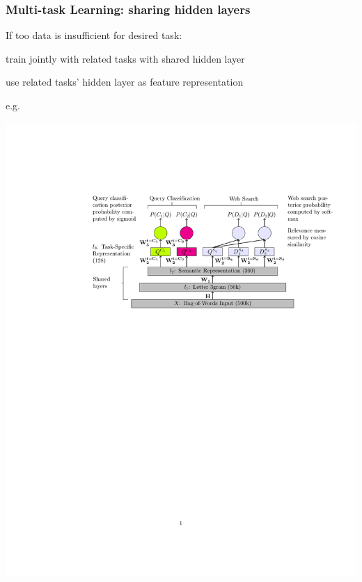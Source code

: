 \begin{frame}
\frametitle{Multi-task Learning: sharing hidden layers }
\bi
\item If too data is insufficient for desired task: 
\be
	\item train jointly with related tasks with shared hidden layer
	\item use related tasks' hidden layer as feature representation
\ee
\item e.g. \cite{liu15multitask}
\ei
\centerline{\includegraphics[scale=0.7]{figs/liu15multitask_mtdnn_arch}}
\end{frame}

